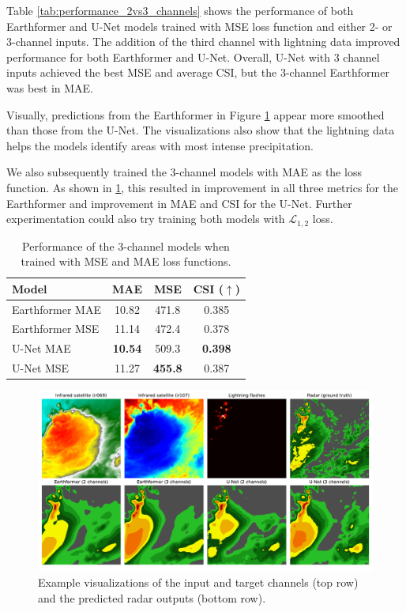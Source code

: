 \documentclass[english]{mvi-report}
\begin{document}
Table \ref{tab:performance_2vs3_channels} shows the performance of both Earthformer and U-Net models trained with MSE loss function and either 2- or 3-channel inputs. The addition of the third channel with lightning data improved performance for both Earthformer and U-Net. Overall, U-Net with 3 channel inputs achieved the best MSE and average CSI, but the 3-channel Earthformer was best in MAE. 

Visually, predictions from the Earthformer in Figure \ref{fig:predictions} appear more smoothed than those from the U-Net. The visualizations also show that the lightning data helps the models identify areas with most intense precipitation.

We also subsequently trained the 3-channel models with MAE as the loss function. As shown in \ref{tab:prformance_MSEvsMAE}, this resulted in improvement in all three metrics for the Earthformer and improvement in MAE and CSI for the U-Net. Further experimentation could also try training both models with $\mathcal{L}_{1,2}$ loss.

\begin{table}
    \centering
    \begin{tabular}{l||ccc}
        Model & MAE & MSE & CSI ($\uparrow$) \\
        \hline\hline
        Earthformer MAE & 10.82 & 471.8 & 0.385 \\
        Earthformer MSE & 11.14 & 472.4 & 0.378 \\
        \hline
        U-Net MAE & \textbf{10.54} & 509.3 & \textbf{0.398} \\
        U-Net MSE & 11.27 & \textbf{455.8} & 0.387 \\
    \end{tabular}
    \caption{Performance of the 3-channel models when trained with MSE and MAE loss functions.}
    \label{tab:prformance_MSEvsMAE}
\end{table}

\begin{figure}[ht]
  \centering\leavevmode
  \includegraphics[width=\linewidth]{img/examples.pdf}
  \caption{Example visualizations of the input and target channels (top row) and the predicted radar outputs (bottom row).}
  \label{fig:predictions}
\end{figure}
\end{document}
